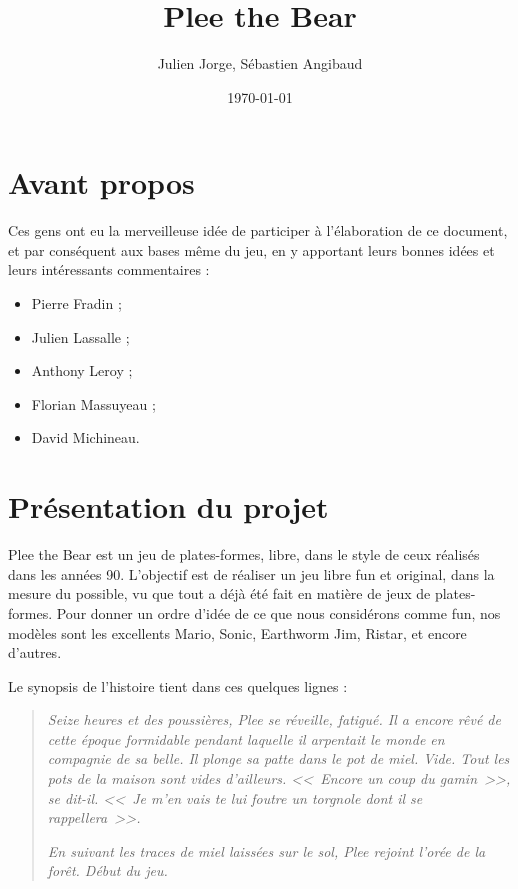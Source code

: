 \documentclass{article}
\title{Plee the Bear}
\author{Julien Jorge, Sébastien Angibaud}
\date{\today}
\begin{document}

\maketitle
\tableofcontents
\newpage

\section{Avant propos}
Ces gens ont eu la merveilleuse idée de participer à l'élaboration de
ce document, et par conséquent aux bases même du jeu, en y apportant
leurs bonnes idées et leurs intéressants commentaires :

\begin{itemize}
\item Pierre Fradin ;
\item Julien Lassalle ;
\item Anthony Leroy ;
\item Florian Massuyeau ;
\item David Michineau.
\end{itemize}

\section{Présentation du projet}
Plee the Bear est un jeu de plates-formes, libre, dans le style de ceux
réalisés dans les années 90. L'objectif est de réaliser un jeu libre
fun et original, dans la mesure du possible, vu que tout a déjà été
fait en matière de jeux de plates-formes. Pour donner un ordre d'idée
de ce que nous considérons comme fun, nos modèles sont les excellents
Mario, Sonic, Earthworm Jim, Ristar, et encore d'autres.

Le synopsis de l'histoire tient dans ces quelques lignes :
\begin{quote}
\emph{Seize heures et des poussières, Plee se réveille, fatigué. Il a encore
rêvé de cette époque formidable pendant laquelle il arpentait le monde
en compagnie de sa belle. Il plonge sa patte dans le pot de
miel. Vide. Tout les pots de la maison sont vides
d'ailleurs. <<~Encore un coup du gamin~>>, se dit-il. <<~Je m'en vais
te lui foutre un torgnole dont il se rappellera~>>.}

\emph{En suivant les traces de miel laissées sur le sol, Plee rejoint
l'orée de la forêt. Début du jeu.}
\end{quote}
\end{document}
